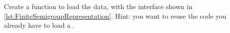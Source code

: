 \begin{longcode}
\caption{}
\label{lst:sm_min3}
\end{longcode}



\begin{gradedexercise}
  \label{ex:TestFiniteSemigroupRepresentation}
  Create a function to load the data, with the interface shown in \cref{lst:FiniteSemigroupRepresentation}.
  Hint: you want to reuse the code you already have to load a \FiniteSet.
\end{gradedexercise}


\begin{longcode}
\caption{}
\label{lst:FiniteSemigroupRepresentation}
\end{longcode}

